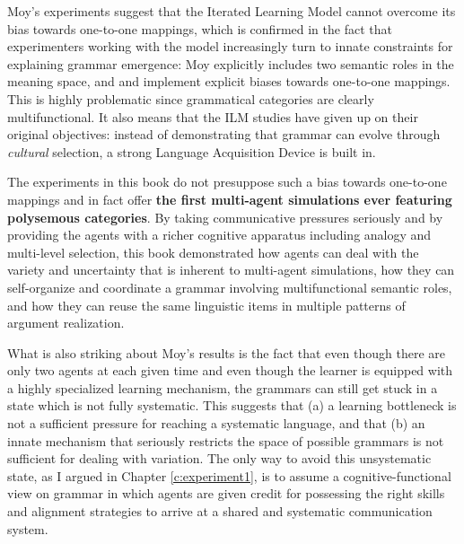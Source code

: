  Moy's experiments suggest that the Iterated Learning Model cannot overcome its bias towards one-to-one mappings, which is confirmed in the fact that experimenters working with the model increasingly turn to innate constraints for explaining grammar emergence: Moy explicitly includes two semantic roles in the meaning space, and \citet{smith03transmission} and \citet{smith03language} implement explicit biases towards one-to-one mappings. This is highly problematic since grammatical categories are clearly multifunctional. It also means that the ILM studies have given up on their original objectives: instead of demonstrating that grammar can evolve through {\em cultural} selection, a strong Language Acquisition Device is built in. 

The experiments in this book do not presuppose such a bias towards one-to-one mappings and in fact offer {\bfseries the first multi-agent simulations ever featuring polysemous categories}. By taking communicative pressures seriously and by providing the agents with a richer cognitive apparatus including analogy and multi-level selection, this book demonstrated how agents can deal with the variety and uncertainty that is inherent to multi-agent simulations, how they can self-organize and coordinate a grammar involving multifunctional semantic roles, and how they can reuse the same linguistic items in multiple patterns of argument realization.

What is also striking about Moy's results is the fact that even though there are only two agents at each given time and even though the learner is equipped with a highly specialized learning mechanism, the grammars can still get stuck in a state which is not fully systematic. This suggests that (a) a learning bottleneck is not a sufficient pressure for reaching a systematic language, and that (b) an innate mechanism that seriously restricts the space of possible grammars is not sufficient for dealing with variation. The only way to avoid this unsystematic state, as I argued in Chapter \ref{c:experiment1}, is to assume a cognitive-functional view on grammar in which agents are given credit for possessing the right skills and alignment strategies to arrive at a shared and systematic communication system.

